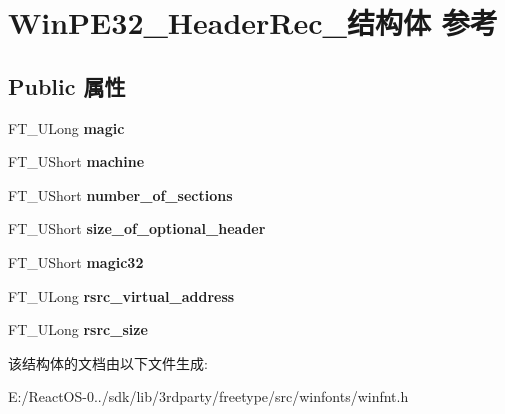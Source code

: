 \hypertarget{struct_win_p_e32___header_rec__}{}\section{Win\+P\+E32\+\_\+\+Header\+Rec\+\_\+结构体 参考}
\label{struct_win_p_e32___header_rec__}
\subsection*{Public 属性}
\begin{DoxyCompactItemize}
\item 
\mbox{\label{struct_win_p_e32___header_rec___a8a706f4efa9d6cfa3212054cd4d40926}} 
F\+T\+\_\+\+U\+Long {\bfseries magic}
\item 
\mbox{\label{struct_win_p_e32___header_rec___ab6cfc39db8a1683b93ee6771acc7d8f7}} 
F\+T\+\_\+\+U\+Short {\bfseries machine}
\item 
\mbox{\label{struct_win_p_e32___header_rec___ab2843afaa320ebc51b2ee48046088a31}} 
F\+T\+\_\+\+U\+Short {\bfseries number\+\_\+of\+\_\+sections}
\item 
\mbox{\label{struct_win_p_e32___header_rec___ad75f351dccabc90e5648f960f5731e9a}} 
F\+T\+\_\+\+U\+Short {\bfseries size\+\_\+of\+\_\+optional\+\_\+header}
\item 
\mbox{\label{struct_win_p_e32___header_rec___ae0cefb11bf49cbb2e7cfd7acf0d247d4}} 
F\+T\+\_\+\+U\+Short {\bfseries magic32}
\item 
\mbox{\label{struct_win_p_e32___header_rec___ad3eb270b628c0ccc4e552edaad685d2b}} 
F\+T\+\_\+\+U\+Long {\bfseries rsrc\+\_\+virtual\+\_\+address}
\item 
\mbox{\label{struct_win_p_e32___header_rec___a1ff2185baf156d98b27554188e0a04fe}} 
F\+T\+\_\+\+U\+Long {\bfseries rsrc\+\_\+size}
\end{DoxyCompactItemize}


该结构体的文档由以下文件生成\+:\begin{DoxyCompactItemize}
\item 
E\+:/\+React\+O\+S-\/0../sdk/lib/3rdparty/freetype/src/winfonts/winfnt.\+h\end{DoxyCompactItemize}

